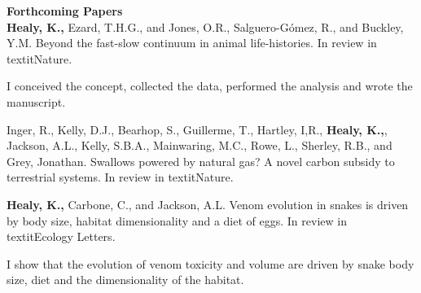 \documentclass[10pt,a4paper]{article}
\begin{document}
\begin{flushleft}
\bigskip

\textbf{Forthcoming Papers}\\

\setlength{\parindent}{0mm}\textbf{Healy, K.,} Ezard, T.H.G., and Jones, O.R., Salguero-Gómez, R., and Buckley, Y.M. Beyond the fast-slow continuum in animal life-histories. In review in textit{Nature}.
\smallskip
\par{\fontsize{10.5}{10} I conceived the concept, collected the data, performed the analysis and wrote the manuscript.}
\smallskip


\setlength{\parindent}{0mm}Inger, R., Kelly, D.J., Bearhop, S., Guillerme, T., Hartley, I,R., \textbf{Healy, K.,}, Jackson, A.L., Kelly, S.B.A., Mainwaring, M.C., Rowe, L., Sherley, R.B., and Grey, Jonathan. Swallows powered by natural gas? A novel carbon subsidy to terrestrial systems. In review in textit{Nature}.
\smallskip


\setlength{\parindent}{0mm}\textbf{Healy, K.,} Carbone, C., and Jackson, A.L. Venom evolution in snakes is driven by body size, habitat dimensionality and a diet of eggs. In review in textit{Ecology Letters}.
\smallskip
\par{\fontsize{10.5}{10} I show that the evolution of venom toxicity and volume are driven by snake body size, diet and the dimensionality of the habitat.}
\smallskip


\bigskip





\end{flushleft}
\end{document}
